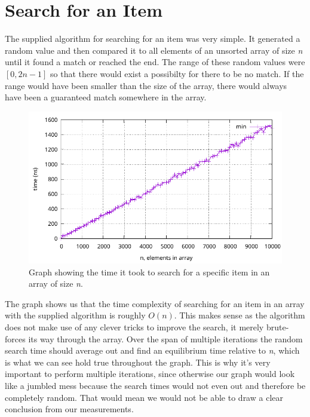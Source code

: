 \documentclass[a4paper, 11pt]{article}
\begin{document}
\section{Search for an Item}
	The supplied algorithm for searching for an item was very simple.
	It generated a random value and then compared it to all elements of an unsorted array of size \textit{n}
	until it found a match or reached the end.
	The range of these random values were \([0, 2n - 1]\) so that there would exist a possibilty for there to be no match.
	If the range would have been smaller than the size of the array, there would always have been a guaranteed match somewhere in the array.
	\par
	\begin{figure}[h]
		\centering
		\includegraphics[scale=0.8]{graphs/plot3.pdf}
		\caption{
			Graph showing the time it took to search for a specific item in an array of size \textit{n}.
		}
	\end{figure}
	The graph shows us that the time complexity of searching for an item in an array with the supplied algorithm is roughly \(O(n)\).
	This makes sense as the algorithm does not make use of any clever tricks to improve the search, it merely brute-forces its way through the array.
	Over the span of multiple iterations the random search time should average out and find an equilibrium time relative to \textit{n},
	which is what we can see hold true throughout the graph. This is why it's very important to perform multiple iterations,
	since otherwise our graph would look like a jumbled mess because the search times would not even out and therefore be completely random.
	That would mean we would not be able to draw a clear conclusion from our measurements.
\end{document}
